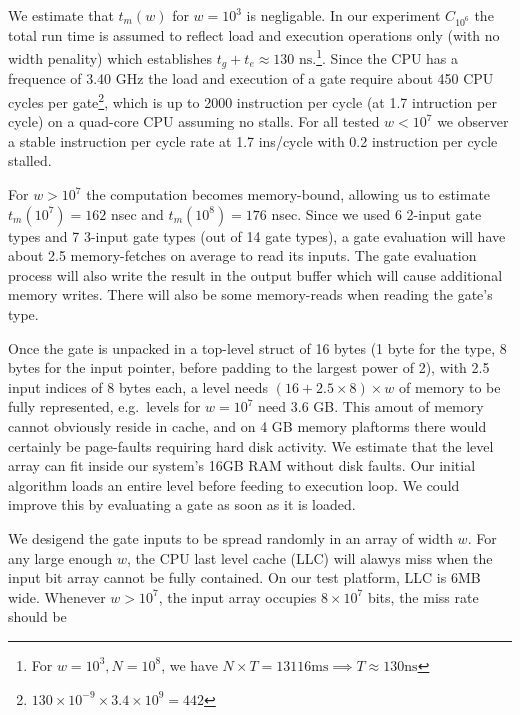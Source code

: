 We estimate that $t_m(w)$ for $w = 10^3$ is negligable. In our experiment $C_{10^6}$ the total run time is assumed to reflect load and execution operations only (with no width penality) which establishes $t_g + t_e \approx 130\text{ ns}$.\footnote{ For $w = 10^3, N=10^8$, we have $N \times T = 13116 \text{ms} \implies T \approx 130 \text{ns}$ }. 
Since the CPU has a frequence of 3.40 GHz the load and execution of a gate require about 450 CPU cycles per gate\footnote{$130 \times 10^{-9} \times 3.4 \times 10^9 = 442$}, which is up to 2000 instruction per cycle (at 1.7 intruction per cycle) on a quad-core CPU assuming no stalls. For all tested $w < 10^7$ we observer a stable instruction per cycle rate at 1.7 ins/cycle with 0.2 instruction per cycle stalled.
\par
For $ w > 10^7$ the computation becomes memory-bound, allowing us to estimate $t_m(10^7) = 162$ nsec and $t_m(10^8) = 176$ nsec. Since we used 6 2-input gate types and 7 3-input gate types (out of 14 gate types), a gate evaluation will have about 2.5 memory-fetches on average to read its inputs. The gate evaluation process will also write the result in the output buffer which will cause additional memory writes. There will also be some memory-reads when reading the gate's type.
\par
Once the gate is unpacked in a top-level struct of 16 bytes (1 byte for the type, 8 bytes for the input pointer, before padding to the largest power of 2), with 2.5 input indices of 8 bytes each, a level needs $ (16 + 2.5 \times 8) \times w $ of memory to be fully represented, e.g.\ levels for $w = 10^7$ need 3.6 GB. This amout of memory cannot obviously reside in cache, and on 4 GB memory plaftorms there would certainly be page-faults requiring hard disk activity. We estimate that the level array can fit inside our system's 16GB RAM without disk faults. Our initial algorithm loads an entire level before feeding to execution loop. We could improve this by evaluating a gate as soon as it is loaded.  
\par
We desigend the gate inputs to be spread randomly in an array of width $w$. For any large enough $w$, the CPU last level cache (LLC) will alawys miss when the input bit array cannot be fully contained. On our test platform, LLC is 6MB wide. Whenever $w > 10^7$, the input array occupies $8 \times 10^7$ bits, the miss rate should be 
